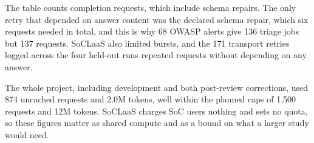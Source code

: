 The table counts completion requests, which include schema repairs. The only retry that depended on answer content was the declared schema repair, which six requests needed in total, and this is why 68 OWASP alerts give 136 triage jobs but 137 requests. SoCLaaS also limited bursts, and the 171 transport retries logged across the four held-out runs repeated requests without depending on any answer.

The whole project, including development and both post-review corrections, used 874 uncached requests and 2.0M tokens, well within the planned caps of 1{,}500 requests and 12M tokens. SoCLaaS charges SoC users nothing and sets no quota, so these figures matter as shared compute and as a bound on what a larger study would need.
